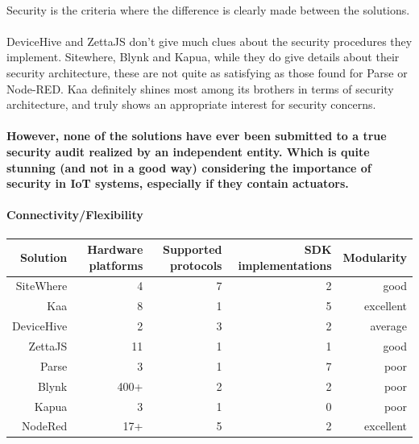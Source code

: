 \documentclass{article}
\begin{document}
\paragraph{} Security is the criteria where the difference is clearly made between the solutions.

\paragraph{} DeviceHive and ZettaJS don't give much clues about the security procedures they implement. Sitewhere, Blynk and Kapua, while they do give details about their security architecture, these are not quite as satisfying as those found for Parse or Node-RED. Kaa definitely shines most among its brothers in terms of security architecture, and truly shows an appropriate interest for security concerns.

\paragraph{} \textbf{However, none of the solutions have ever been submitted to a true security audit realized by an independent entity. Which is quite stunning (and not in a good way) considering the importance of security in IoT systems, especially if they contain actuators.}

\paragraph{Connectivity/Flexibility}

\begin{center}
\begin{tabular}{r|r|r|r|r}
Solution & Hardware platforms & Supported protocols & SDK implementations & Modularity \\ \hline
SiteWhere & \cellcolor{orange!25}4 & \cellcolor{green!25}7 & \cellcolor{orange!25}2 & \cellcolor{blue!10}good \\
Kaa & \cellcolor{green!25}8 & \cellcolor{red!25}1 & \cellcolor{green!25}5 & \cellcolor{green!25}excellent \\
DeviceHive & \cellcolor{red!25}2 & \cellcolor{orange!25}3 & \cellcolor{orange!25}2 & \cellcolor{yellow!25}average \\
ZettaJS & \cellcolor{green!25}11 & \cellcolor{red!25}1 & \cellcolor{red!25}1 & \cellcolor{blue!10}good \\
Parse & \cellcolor{orange!25}3 & \cellcolor{red!25}1 & \cellcolor{green!25}7 & \cellcolor{orange!25}poor \\
Blynk & \cellcolor{green!25}400+ & \cellcolor{orange!25}2 & \cellcolor{orange!25}2 & \cellcolor{orange!25}poor \\
Kapua & \cellcolor{orange!25}3 & \cellcolor{red!25}1 & \cellcolor{red!25}0 & \cellcolor{orange!25}poor \\
NodeRed & \cellcolor{green!25}17+ & \cellcolor{green!25}5 & \cellcolor{orange!25}2 & \cellcolor{green!25}excellent \\
\end{tabular}
\end{center}
\end{document}
